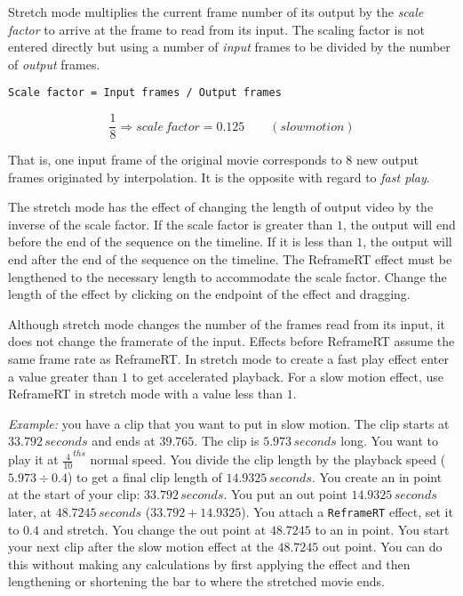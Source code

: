 Stretch mode multiplies the current frame number of its output by the \textit{scale factor} to arrive at the frame to read from its input. The scaling factor is not entered directly but using a number of \textit{input} frames to be divided by the number of \textit{output} frames.

\vspace{1ex} \texttt{Scale factor = Input frames / Output frames}

\[\frac{1}{8} \Rightarrow scale\, factor = 0.125 \qquad (slowmotion)\]

That is, one input frame of the original movie corresponds to $8$ new output frames originated by interpolation. It is the opposite with regard to \textit{fast play}.

The stretch mode has the effect of changing the length of output video by the inverse of the scale factor. If the scale factor is greater than $1$, the output will end before the end of the sequence on the timeline. If it is less than $1$, the output will end after the end of the sequence on the timeline. The ReframeRT effect must be lengthened to the necessary length to accommodate the scale factor. Change the length of the effect by clicking on the endpoint of the effect and dragging.

Although stretch mode changes the number of the frames read from its
input, it does not change the framerate of the input. Effects before
ReframeRT assume the same frame rate as ReframeRT\@.  In stretch
mode to create a fast play effect enter a value greater than $1$ to
get accelerated playback.  For a slow motion effect, use ReframeRT
in stretch mode with a value less than $1$.

\textit{Example:} you have a clip that you want to put in slow motion. The clip starts at $33.792\, seconds$ and ends at $39.765$. The clip is $5.973\, seconds$ long. You want to play it at $\frac{4}{10}^{ths}$ normal speed. You divide the clip length by the playback speed ($5.973\div0.4$) to get a final clip length of $14.9325\,seconds$. You create an in point at the start of your clip: $33.792\,seconds$. You put an out point $14.9325\,seconds$ later, at $48.7245\,seconds$ ($33.792 + 14.9325$). You attach a \texttt{ReframeRT} effect, set it to $0.4$ and stretch. You change the out point at $48.7245$ to an in point. You start your next clip after the slow motion effect at the $48.7245$ out point. You can do this without making any calculations by first applying the effect and then lengthening or shortening the bar to where the stretched movie ends.

